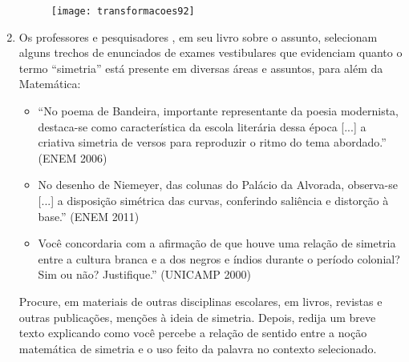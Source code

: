 \begin{enumerate}
\begin{figure}[H]
\centering

\texttt{[image: transformacoes92]}
\end{figure}






\item Os professores e pesquisadores \citeauthor{pasquini2015}, em seu livro sobre o assunto, selecionam alguns trechos de enunciados de exames vestibulares que evidenciam quanto o termo “simetria” está presente em diversas áreas e assuntos, para além da Matemática: 
\begin{itemize}
\item “No poema de Bandeira, importante representante da poesia modernista, destaca-se como característica da escola literária dessa época [...] a criativa simetria de versos para reproduzir o ritmo do tema abordado.” (ENEM 2006)
\item No desenho de Niemeyer, das colunas do Palácio da Alvorada, observa-se [...] a disposição simétrica das curvas, conferindo saliência e distorção à base.” (ENEM 2011)
\item Você concordaria com a afirmação de que houve uma relação de simetria entre a cultura branca e a dos negros e índios durante o período colonial? Sim ou não? Justifique.” (UNICAMP 2000)
\end{itemize}
Procure, em materiais de outras disciplinas escolares, em livros, revistas e outras publicações, menções à ideia de simetria. Depois, redija um breve texto explicando como você percebe a relação de sentido entre a noção matemática de simetria e o uso feito da palavra no contexto selecionado.

\end{enumerate}


